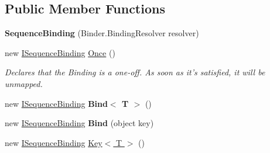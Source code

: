 \subsection*{Public Member Functions}
\begin{DoxyCompactItemize}
\item 
\hypertarget{classstrange_1_1extensions_1_1sequencer_1_1impl_1_1_sequence_binding_aa78a28ba46eba07658cb34a13e45419a}{{\bfseries Sequence\-Binding} (Binder.\-Binding\-Resolver resolver)}\label{classstrange_1_1extensions_1_1sequencer_1_1impl_1_1_sequence_binding_aa78a28ba46eba07658cb34a13e45419a}

\item 
\hypertarget{classstrange_1_1extensions_1_1sequencer_1_1impl_1_1_sequence_binding_a073ca25f3860ecf53b90fbf44a7cd679}{new \hyperlink{interfacestrange_1_1extensions_1_1sequencer_1_1api_1_1_i_sequence_binding}{I\-Sequence\-Binding} \hyperlink{classstrange_1_1extensions_1_1sequencer_1_1impl_1_1_sequence_binding_a073ca25f3860ecf53b90fbf44a7cd679}{Once} ()}\label{classstrange_1_1extensions_1_1sequencer_1_1impl_1_1_sequence_binding_a073ca25f3860ecf53b90fbf44a7cd679}

\begin{DoxyCompactList}\small\item\em Declares that the Binding is a one-\/off. As soon as it's satisfied, it will be unmapped. \end{DoxyCompactList}\item 
\hypertarget{classstrange_1_1extensions_1_1sequencer_1_1impl_1_1_sequence_binding_a0aa1146feb6da03085a51bea2d9ea54e}{new \hyperlink{interfacestrange_1_1extensions_1_1sequencer_1_1api_1_1_i_sequence_binding}{I\-Sequence\-Binding} {\bfseries Bind$<$ T $>$} ()}\label{classstrange_1_1extensions_1_1sequencer_1_1impl_1_1_sequence_binding_a0aa1146feb6da03085a51bea2d9ea54e}

\item 
\hypertarget{classstrange_1_1extensions_1_1sequencer_1_1impl_1_1_sequence_binding_a21daba07eec62b0e40cfe1b525cf3253}{new \hyperlink{interfacestrange_1_1extensions_1_1sequencer_1_1api_1_1_i_sequence_binding}{I\-Sequence\-Binding} {\bfseries Bind} (object key)}\label{classstrange_1_1extensions_1_1sequencer_1_1impl_1_1_sequence_binding_a21daba07eec62b0e40cfe1b525cf3253}

\item 
\hypertarget{classstrange_1_1extensions_1_1sequencer_1_1impl_1_1_sequence_binding_a3400972a65ffadd0eb2dc9241c8b3165}{new \hyperlink{interfacestrange_1_1extensions_1_1sequencer_1_1api_1_1_i_sequence_binding}{I\-Sequence\-Binding} \hyperlink{classstrange_1_1extensions_1_1sequencer_1_1impl_1_1_sequence_binding_a3400972a65ffadd0eb2dc9241c8b3165}{Key$<$ T $>$} ()}\label{classstrange_1_1extensions_1_1sequencer_1_1impl_1_1_sequence_binding_a3400972a65ffadd0eb2dc9241c8b3165}


\end{DoxyCompactItemize}
